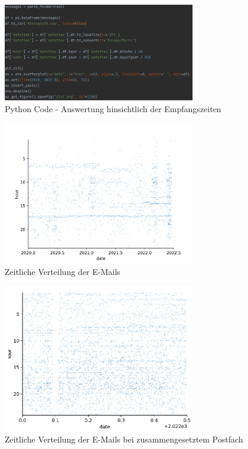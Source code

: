 \begin{figure}
    \centering
    \includegraphics[width=0.75\textwidth]{images/Auswertung_Zeiten.PNG}
    \caption{Python Code - Auswertung hinsichtlich der Empfangszeiten} 
    \label{fig:emailsdatetime}
\end{figure}

\begin{figure}
    \centering
    \includegraphics[width=0.75\textwidth]{images/plot.PNG}
    \caption{Zeitliche Verteilung der E-Mails} 
    \label{fig:auswertungzeitlich}
\end{figure}


\begin{figure}
    \centering
    \includegraphics[width=0.75\textwidth]{images/merged_plot.PNG}
    \caption{Zeitliche Verteilung der E-Mails bei zusammengesetztem Postfach} 
    \label{fig:auswertungzeitlichmerged}
\end{figure}